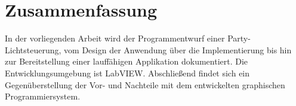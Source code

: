 \label{chap:Zusammenfassung}
\section*{Zusammenfassung}

In der vorliegenden Arbeit wird der Programmentwurf einer Party-Lichtsteuerung, vom Design der Anwendung über die Implementierung bis hin zur Bereitstellung einer lauffähigen Applikation dokumentiert. Die Entwicklungsumgebung ist LabVIEW. Abschließend findet sich ein Gegenüberstellung der Vor- und Nachteile mit dem entwickelten graphischen Programmiersystem.


